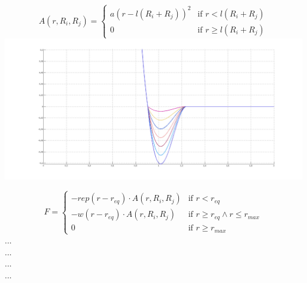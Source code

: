 $$A(r,R_i,R_j) = \begin{cases}  a (r - l (R_i+R_j))^2 & \text{if } r < l (R_i+R_j) \\ 0 & \text{if } r \geq l(R_i+R_j)  \end{cases}$$
\includegraphics{../../images/MECAGEN/potential/potential_linear_force_scale.png}

$$F = \begin{cases} - rep (r-r_{eq}) \cdot A(r,R_i,R_j)  & \text{if }r< r_{eq} \\ - w (r-r_{eq})  \cdot A(r,R_i,R_j) & \text{if }r\geq r_{eq} \wedge r \leq r_{max} \\ 0 & \text{if } r \geq r_{max}  \end{cases}$$   ...
\\ ...
\\ ...
\\ ...
\\

